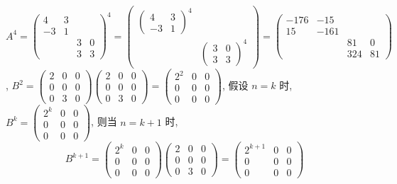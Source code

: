 	 \paragraph{} %
		 $A^4 = \begin{pmatrix}
				 4  & 3 &   &   \\
				 -3 & 1 &   &   \\
				    &   & 3 & 0 \\
				    &   & 3 & 3
			 \end{pmatrix}^{4} = \begin{pmatrix}
				 \begin{pmatrix}
					 4  & 3 \\
					 -3 & 1
				 \end{pmatrix}^{4} &                   \\
				                   & \begin{pmatrix}
					                     3 & 0 \\
					                     3 & 3
				                     \end{pmatrix}^{4}
			 \end{pmatrix} =
			 \begin{pmatrix}
				 -176 & -15  &     &    \\
				 15   & -161 &     &    \\
				      &      & 81  & 0  \\
				      &      & 324 & 81
			 \end{pmatrix}$,
		 $B^2 = \begin{pmatrix}
				 2 & 0 & 0 \\
				 0 & 0 & 0 \\
				 0 & 3 & 0
			 \end{pmatrix}
			 \begin{pmatrix}
				 2 & 0 & 0 \\
				 0 & 0 & 0 \\
				 0 & 3 & 0
			 \end{pmatrix} = \begin{pmatrix}
				 2^2 & 0 & 0 \\
				 0   & 0 & 0 \\
				 0   & 0 & 0
			 \end{pmatrix}$,
		 假设 $n=k$ 时, $B^k = \begin{pmatrix}
				 2^k & 0 & 0 \\
				 0   & 0 & 0 \\
				 0   & 0 & 0
			 \end{pmatrix}$, 则当 $n=k+1$ 时,
		 \[B^{k+1} = \begin{pmatrix}
				 2^k & 0 & 0 \\
				 0   & 0 & 0 \\
				 0   & 0 & 0
			 \end{pmatrix}
			 \begin{pmatrix}
				 2 & 0 & 0 \\
				 0 & 0 & 0 \\
				 0 & 3 & 0
			 \end{pmatrix} = \begin{pmatrix}
				 2^{k+1} & 0 & 0 \\
				 0       & 0 & 0 \\
				 0       & 0 & 0
			 \end{pmatrix}\]
